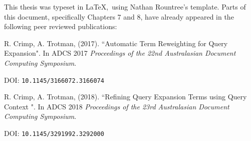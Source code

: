 This thesis was typeset in \LaTeX,~using Nathan Rountree's template. Parts of this document, specifically Chapters 7 and 8, have already appeared in the following peer reviewed publications:

\noindent
R. Crimp, A. Trotman, (2017). ``Automatic Term Reweighting for Query Expansion". In ADCS 2017 \textit{Proceedings of the 22nd Australasian Document Computing Symposium}. 

DOI: \texttt{10.1145/3166072.3166074}

\noindent
R. Crimp, A. Trotman, (2018). ``Refining Query Expansion Terms using Query Context
". In ADCS 2018 \textit{Proceedings of the 23rd Australasian Document Computing Symposium}. 

DOI: \texttt{10.1145/3291992.3292000}
